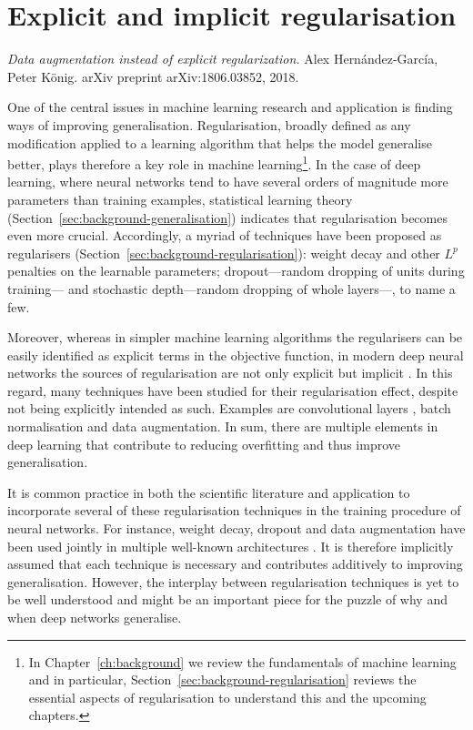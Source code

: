 {
\chapter{Explicit and implicit regularisation}
\label{ch:reg}
\renewcommand{\chapterpath}{includes/regularisation}
%
\begin{outreach}
    \item \textit{Data augmentation instead of explicit regularization.} Alex Hern{\'a}ndez-Garc{\'i}a, Peter K{\"o}nig. arXiv preprint arXiv:1806.03852, 2018.
\end{outreach}
%
One of the central issues in machine learning research and application is finding ways of improving generalisation. Regularisation, broadly defined as any modification applied to a learning algorithm that helps the model generalise better, plays therefore a key role in machine learning\footnote{In Chapter~\ref{ch:background} we review the fundamentals of machine learning and in particular, Section~\ref{sec:background-regularisation} reviews the essential aspects of regularisation to understand this and the upcoming chapters.}. In the case of deep learning, where neural networks tend to have several orders of magnitude more parameters than training examples, statistical learning theory (Section~\ref{sec:background-generalisation}) indicates that regularisation becomes even more crucial. Accordingly, a myriad of techniques have been proposed as regularisers (Section~\ref{sec:background-regularisation}): weight decay \citep{hanson1989wd} and other $L^p$ penalties on the learnable parameters; dropout---random dropping of units during training---\citep{srivastava2014dropout} and stochastic depth---random dropping of whole layers---\citep{huang2016stochasticdepth}, to name a few. 

Moreover, whereas in simpler machine learning algorithms the regularisers can be easily identified as explicit terms in the objective function, in modern deep neural networks the sources of regularisation are not only explicit but implicit \citep{neyshabur2014implicitreg}.  In this regard, many techniques have been studied for their regularisation effect, despite not being explicitly intended as such. Examples are convolutional layers \citep{lecun1990conv}, batch normalisation \citep{ioffe2015batchnorm} and data augmentation. In sum, there are multiple elements in deep learning that contribute to reducing overfitting and thus improve generalisation.

It is common practice in both the scientific literature and application to incorporate several of these regularisation techniques in the training procedure of neural networks. For instance, weight decay, dropout and data augmentation have been used jointly in multiple well-known architectures \citep{tan2019efficientnet, huang2017densenet, zagoruyko2016wrn, springenberg2014allcnn}. It is therefore implicitly assumed that each technique  is necessary and contributes additively to improving generalisation. However, the interplay between regularisation techniques is yet to be well understood and might be an important piece for the puzzle of why and when deep networks generalise. 

}
